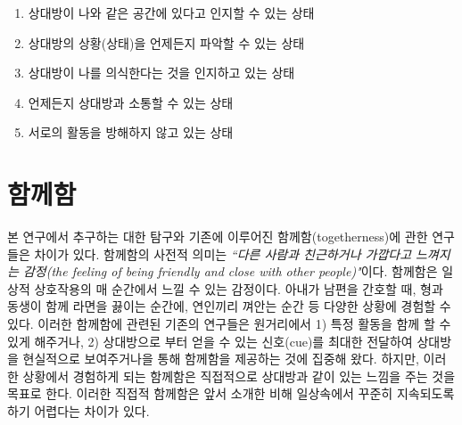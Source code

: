 \begin{center}
\begin{minipage}{.6\textwidth}
\begin{enumerate}[label=\Roman*., noitemsep]
	\item 상대방이 나와 같은 공간에 있다고 인지할 수 있는 상태
	\item 상대방의 상황(상태)을 언제든지 파악할 수 있는 상태
	\item 상대방이 나를 의식한다는 것을 인지하고 있는 상태
	\item 언제든지 상대방과 소통할 수 있는 상태
	\item 서로의 활동을 방해하지 않고 있는 상태
\end{enumerate}
\end{minipage}
\end{center}


\section{ 함께함}

본 연구에서 추구하는  대한 탐구와 기존에 이루어진 함께함(togetherness)에 관한 연구들은 차이가 있다. 함께함의 사전적 의미는 \textit{``다른 사람과 친근하거나 가깝다고 느껴지는 감정(the feeling of being friendly and close with other people)"}이다\cite{def_togetherness}.
함께함은 일상적 상호작용의 매 순간에서 느낄 수 있는 감정이다.
아내가 남편을 간호할 때, 형과 동생이 함께 라면을 끓이는 순간에, 연인끼리 껴안는 순간 등 다양한 상황에 경험할 수 있다. 
이러한 함께함에 관련된 기존의 연구들은 원거리에서 
1) 특정 활동을 함께 할 수 있게 해주거나\cite{flexNfeel}, 
2) 상대방으로 부터 얻을 수 있는 신호(cue)를 최대한 전달하여 상대방을 현실적으로 보여주거나\cite{gibbs1999teleport,orts2016holoportation}을 통해 함께함을 제공하는 것에 집중해 왔다.
하지만, 이러한 상황에서 경험하게 되는 함께함은 직접적으로 상대방과 같이 있는 느낌을 주는 것을 목표로 한다. 이러한 직접적 함께함은 앞서 소개한  비해 일상속에서 꾸준히 지속되도록 하기 어렵다는  차이가 있다.


%

